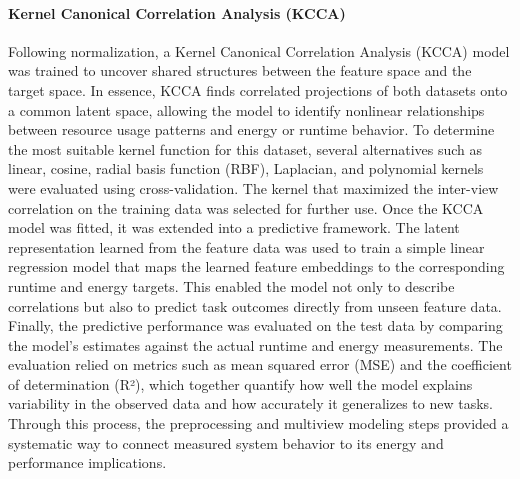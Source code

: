 \paragraph{Kernel Canonical Correlation Analysis (KCCA)}
\label{sec:kcca}
Following normalization, a Kernel Canonical Correlation Analysis (KCCA) model was trained to uncover shared structures between the feature space and the target space. In essence, KCCA finds correlated projections of both datasets onto a common latent space, allowing the model to identify nonlinear relationships between resource usage patterns and energy or runtime behavior. To determine the most suitable kernel function for this dataset, several alternatives such as linear, cosine, radial basis function (RBF), Laplacian, and polynomial kernels were evaluated using cross-validation. The kernel that maximized the inter-view correlation on the training data was selected for further use.
Once the KCCA model was fitted, it was extended into a predictive framework. The latent representation learned from the feature data was used to train a simple linear regression model that maps the learned feature embeddings to the corresponding runtime and energy targets. This enabled the model not only to describe correlations but also to predict task outcomes directly from unseen feature data.
Finally, the predictive performance was evaluated on the test data by comparing the model’s estimates against the actual runtime and energy measurements. The evaluation relied on metrics such as mean squared error (MSE) and the coefficient of determination (R²), which together quantify how well the model explains variability in the observed data and how accurately it generalizes to new tasks. Through this process, the preprocessing and multiview modeling steps provided a systematic way to connect measured system behavior to its energy and performance implications.

